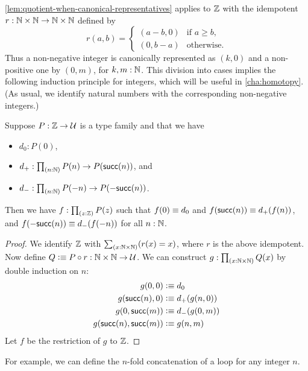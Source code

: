 \begin{rmk}\label{Z-quotient-by-canonical-representatives}
\autoref{lem:quotient-when-canonical-representatives} applies to $\mathbb{Z}$ with the idempotent $r : \mathbb{N} \times \mathbb{N} \to \mathbb{N} \times \mathbb{N}$
defined by
%
\begin{equation*}
  r(a, b) =
  \begin{cases}
    (a - b, 0) & \text{if $a \geq b$,} \\
    (0, b - a) & \text{otherwise.}
  \end{cases}  
\end{equation*}
%
Thus a non-negative integer is canonically represented as $(k, 0)$ and a non-positive one by $(0, m)$, for $k,m:\mathbb{N}$.
This division into cases implies the following induction principle for integers, which will be useful in \autoref{cha:homotopy}.
(As usual, we identify natural numbers with the corresponding non-negative integers.)
\end{rmk}

\begin{lem}\label{thm:sign-induction}
  Suppose $P:\mathbb{Z}\to\mathcal{U}$ is a type family and that we have
  \begin{itemize}
  \item $d_0: P(0)$,
  \item $d_+: \prd{n:\N} P(n) \to P(\suc(n))$, and
  \item $d_- : \prd{n:\N} P(-n) \to P(-\suc(n))$.
  \end{itemize}
  Then we have $f:\prd{z:\Z} P(z)$ such that $f(0)\equiv d_0$ and $f(\mathsf{succ}(n))\equiv d_+(f(n))$, and $f(-\mathsf{succ}(n))\equiv d_-(f(-n))$ for all $n:\mathbb{N}$.
\end{lem}
\begin{proof}
  We identify $\mathbb{Z}$ with $\sm{x:\N\times\N}(r(x)=x)$, where $r$ is the above idempotent.
  Now define $Q\vcentcolon\equiv P\circ r:\mathbb{N}\times \mathbb{N} \to \mathcal{U}$.
  We can construct $g:\prd{x:\N\times \N} Q(x)$ by double induction on $n$:
  \begin{align*}
    g(0,0) &\vcentcolon\equiv d_0\\
    g(\mathsf{succ}(n),0) &\vcentcolon\equiv d_+(g(n,0))\\
    g(0,\mathsf{succ}(m)) &\vcentcolon\equiv d_-(g(0,m))\\
    g(\mathsf{succ}(n),\mathsf{succ}(m)) &\vcentcolon\equiv g(n,m)
  \end{align*}
  Let $f$ be the restriction of $g$ to $\mathbb{Z}$.
\end{proof}

For example, we can define the $n$-fold concatenation of a loop for any integer $n$.

